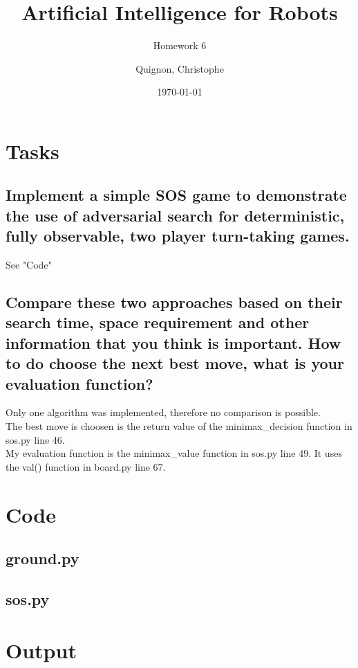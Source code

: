 \documentclass{scrartcl}
\begin{document}
\title{Artificial Intelligence for Robots}
\subtitle{Homework 6}
\author{
  Quignon, Christophe \\
} 
\date{\today}

\maketitle{}
\section{Tasks}
\subsection{Implement a simple SOS game to demonstrate the use of adversarial search for deterministic, fully observable, two player turn-taking games.
}
See "Code"

\subsection{Compare these two approaches based on their search time, space requirement and other information that you think is important. How to do choose the next best move, what is your evaluation function?}
Only one algorithm was implemented, therefore no comparison is possible.\\
The best move is choosen is the return value of the minimax\_decision function in sos.py line 46.\\
My evaluation function is the minimax\_value function in sos.py line 49. It uses the val() function in board.py line 67.


\newpage
\section{Code}
\subsection{ground.py}

\newpage
\subsection{sos.py}


\newpage
\section{Output}


\end{document}
